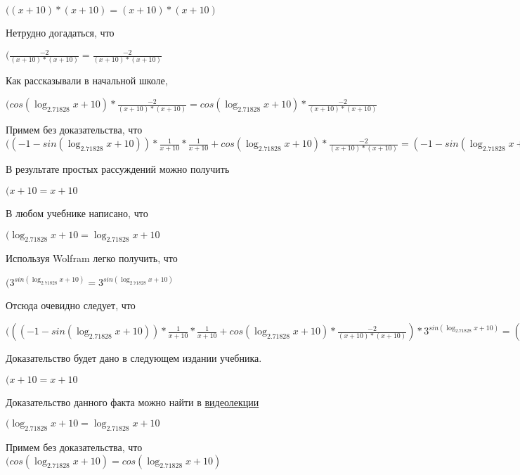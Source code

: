 \documentclass[12pt,a4paper,fleqn]{article}
\theoremstyle{definition}
\begin{document}
$(( x  +  10 ) * ( x  +  10 ) = ( x  +  10 ) * ( x  +  10 )$

Нетрудно догадаться, что

$(\frac{ -2 }{( x  +  10 ) * ( x  +  10 )}
 = \frac{ -2 }{( x  +  10 ) * ( x  +  10 )}
$

Как рассказывали в начальной школе,

$(cos(\log_{ 2.71828 }{ x  +  10 }) * \frac{ -2 }{( x  +  10 ) * ( x  +  10 )}
 = cos(\log_{ 2.71828 }{ x  +  10 }) * \frac{ -2 }{( x  +  10 ) * ( x  +  10 )}
$

Примем без доказательства, что
$(( -1  - sin(\log_{ 2.71828 }{ x  +  10 })) * \frac{ 1 }{ x  +  10 }
 * \frac{ 1 }{ x  +  10 }
 + cos(\log_{ 2.71828 }{ x  +  10 }) * \frac{ -2 }{( x  +  10 ) * ( x  +  10 )}
 = ( -1  - sin(\log_{ 2.71828 }{ x  +  10 })) * \frac{ 1 }{ x  +  10 }
 * \frac{ 1 }{ x  +  10 }
 + cos(\log_{ 2.71828 }{ x  +  10 }) * \frac{ -2 }{( x  +  10 ) * ( x  +  10 )}
$

В результате простых рассуждений можно получить

$( x  +  10  =  x  +  10 $

В любом учебнике написано, что

$(\log_{ 2.71828 }{ x  +  10 } = \log_{ 2.71828 }{ x  +  10 }$

Используя Wolfram легко получить, что

$({ 3 }^{sin(\log_{ 2.71828 }{ x  +  10 })} = { 3 }^{sin(\log_{ 2.71828 }{ x  +  10 })}$

Отсюда очевидно следует, что

$((( -1  - sin(\log_{ 2.71828 }{ x  +  10 })) * \frac{ 1 }{ x  +  10 }
 * \frac{ 1 }{ x  +  10 }
 + cos(\log_{ 2.71828 }{ x  +  10 }) * \frac{ -2 }{( x  +  10 ) * ( x  +  10 )}
) * { 3 }^{sin(\log_{ 2.71828 }{ x  +  10 })} = (( -1  - sin(\log_{ 2.71828 }{ x  +  10 })) * \frac{ 1 }{ x  +  10 }
 * \frac{ 1 }{ x  +  10 }
 + cos(\log_{ 2.71828 }{ x  +  10 }) * \frac{ -2 }{( x  +  10 ) * ( x  +  10 )}
) * { 3 }^{sin(\log_{ 2.71828 }{ x  +  10 })}$

Доказательство будет дано в следующем издании учебника.

$( x  +  10  =  x  +  10 $

Доказательство данного факта можно найти в \href{https://www.youtube.com/watch?v=dQw4w9WgXcQ}{видеолекции}

$(\log_{ 2.71828 }{ x  +  10 } = \log_{ 2.71828 }{ x  +  10 }$

Примем без доказательства, что
$(cos(\log_{ 2.71828 }{ x  +  10 }) = cos(\log_{ 2.71828 }{ x  +  10 })$
\end{document}
